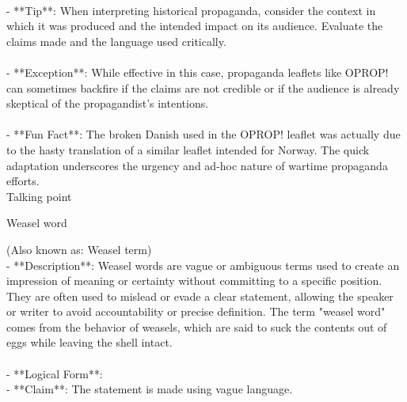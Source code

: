 \documentclass[a4paper,12pt,single,pdftex]{scrbook}
\begin{document}
    
      
    \\

    
      - **Tip**: When interpreting historical propaganda, consider the context in which it was produced and the intended impact on its audience. Evaluate the claims made and the language used critically.
    \\

    
      
    \\

    
      - **Exception**: While effective in this case, propaganda leaflets like OPROP! can sometimes backfire if the claims are not credible or if the audience is already skeptical of the propagandist's intentions.
    \\

    
      
    \\

    
      - **Fun Fact**: The broken Danish used in the OPROP! leaflet was actually due to the hasty translation of a similar leaflet intended for Norway. The quick adaptation underscores the urgency and ad-hoc nature of wartime propaganda efforts.
    \\

  

Talking point

Weasel word
    
      (Also known as: Weasel term)
    \\

  
    
      - **Description**: Weasel words are vague or ambiguous terms used to create an impression of meaning or certainty without committing to a specific position. They are often used to mislead or evade a clear statement, allowing the speaker or writer to avoid accountability or precise definition. The term "weasel word" comes from the behavior of weasels, which are said to suck the contents out of eggs while leaving the shell intact.
    \\

    
      
    \\

    
      - **Logical Form**:
    \\

    
        - **Claim**: The statement is made using vague language.
    \\
\end{document}
